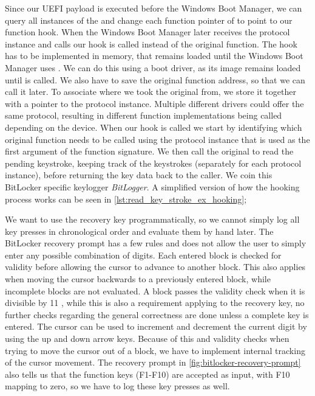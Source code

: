 Since our \ac{UEFI} payload is executed before the Windows Boot Manager, we can query all instances of the  and change each function pointer of  to point to our function hook.
When the Windows Boot Manager later receives the protocol instance and calls  our hook is called instead of the original function.
The hook has to be implemented in memory, that remains loaded until the Windows Boot Manager uses .
We can do this using a boot driver, as its image remains loaded until  is called.
We also have to save the original function address, so that we can call it later.
To associate where we took the original from, we store it together with a pointer to the protocol instance.
Multiple different drivers could offer the same protocol, resulting in different function implementations being called depending on the device.
When our hook is called we start by identifying which original function needs to be called using the protocol instance that is used as the first argument of the  function signature.
We then call the original to read the pending keystroke, keeping track of the keystrokes (separately for each protocol instance), before returning the key data back to the caller.
We coin this BitLocker specific keylogger \emph{BitLogger}.
A simplified version of how the hooking process works can be seen in \autoref{lst:read_key_stroke_ex_hooking};

\vspace{1em}



We want to use the recovery key programmatically, so we cannot simply log all key presses in chronological order and evaluate them by hand later.
The BitLocker recovery prompt has a few rules and does not allow the user to simply enter any possible combination of digits.
Each entered block is checked for validity before allowing the cursor to advance to another block.
This also applies when moving the cursor backwards to a previously entered block, while incomplete blocks are not evaluated.
A block passes the validity check when it is divisible by 11 \cite[Section 9]{windows-internals-6-part2}, while this is also a requirement applying to the recovery key, no further checks regarding the general correctness are done unless a complete key is entered.
The cursor can be used to increment and decrement the current digit by using the up and down arrow keys.
Because of this and validity checks when trying to move the cursor out of a block, we have to implement internal tracking of the cursor movement.
The recovery prompt in \autoref{fig:bitlocker-recovery-prompt} also tells us that the function keys (F1-F10) are accepted as input, with F10 mapping to zero, so we have to log these key presses as well.

